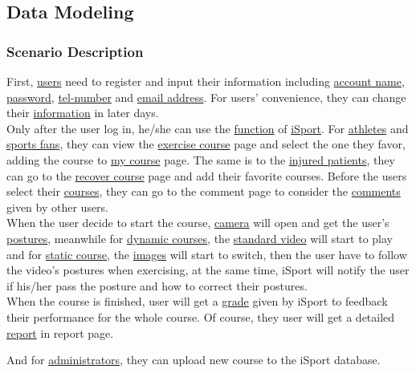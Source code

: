 \documentclass[16pt]{scrreprt}
\begin{document}
\subsection{Data Modeling}
\subsubsection{Scenario Description}
First, \underline{users} need to register and input their information including \underline{account name}, \underline{password}, \underline{tel-number} and \underline{email address}. For users’ convenience, they can change their \underline{information} in later days.\\

\noindent Only after the user log in, he/she can use the \underline{function} of \underline{iSport}. For \underline{athletes} and \underline{sports fans}, they can view the \underline{exercise course} page and select the one they favor, adding the course to \underline{my course} page. The same is to the \underline{injured patients}, they can go to the \underline{recover course} page and add their favorite courses. Before the users select their \underline{courses}, they can go to the comment page to consider the \underline{comments} given by other users. \\

\noindent When the user decide to start the course, \underline{camera} will open and get the user’s \underline{postures}, meanwhile for \underline{dynamic courses}, the \underline{standard video} will start to play and for \underline{static course}, the \underline{images} will start to switch, then the user have to follow the video’s postures when exercising, at the same time, iSport will notify the user if his/her pass the posture and how to correct their postures. \\

\noindent When the course is finished, user will get a \underline{grade} given by iSport to feedback their performance for the whole course. Of course, they user will get a detailed \underline{report} in report page.

\noindent And for \underline{administrators}, they can upload new course to the iSport database.
\end{document}
